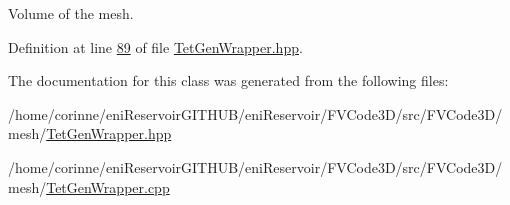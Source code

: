 Volume of the mesh. 



Definition at line \hyperlink{TetGenWrapper_8hpp_source_l00089}{89} of file \hyperlink{TetGenWrapper_8hpp_source}{Tet\+Gen\+Wrapper.\+hpp}.



The documentation for this class was generated from the following files\+:\begin{DoxyCompactItemize}
\item 
/home/corinne/eni\+Reservoir\+G\+I\+T\+H\+U\+B/eni\+Reservoir/\+F\+V\+Code3\+D/src/\+F\+V\+Code3\+D/mesh/\hyperlink{TetGenWrapper_8hpp}{Tet\+Gen\+Wrapper.\+hpp}\item 
/home/corinne/eni\+Reservoir\+G\+I\+T\+H\+U\+B/eni\+Reservoir/\+F\+V\+Code3\+D/src/\+F\+V\+Code3\+D/mesh/\hyperlink{TetGenWrapper_8cpp}{Tet\+Gen\+Wrapper.\+cpp}\end{DoxyCompactItemize}
